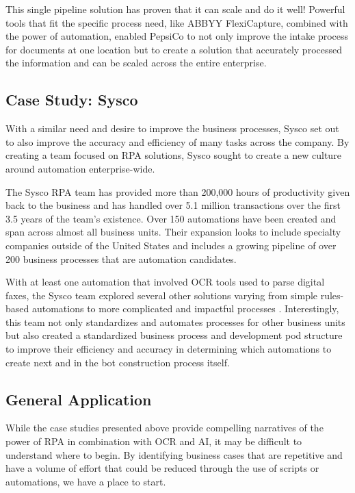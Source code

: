 \documentclass[conference]{IEEEtran}
\begin{document}
This single pipeline solution has proven that it can scale and do it well! Powerful tools that fit the specific process need, like ABBYY FlexiCapture, combined with the power of automation, enabled PepsiCo to not only improve the intake process for documents at one location but to create a solution that accurately processed the information and can be scaled across the entire enterprise.

\subsection{Case Study: Sysco}
With a similar need and desire to improve the business processes, Sysco set out to also improve the accuracy and efficiency of many tasks across the company. By creating a team focused on RPA solutions, Sysco sought to create a new culture around automation enterprise-wide.

The Sysco RPA team has provided more than 200,000 hours of productivity given back to the business and has handled over 5.1 million transactions over the first 3.5 years of the team's existence. Over 150 automations have been created and span across almost all business units. Their expansion looks to include specialty companies outside of the United States and includes a growing pipeline of over 200 business processes that are automation candidates. \cite{bpcafe2021sysco:slides}

With at least one automation that involved OCR tools used to parse digital faxes, the Sysco team explored several other solutions varying from simple rules-based automations to more complicated and impactful processes \cite{bpcafe2021sysco}. Interestingly, this team not only standardizes and automates processes for other business units but also created a standardized business process and development pod structure to improve their efficiency and accuracy in determining which automations to create next and in the bot construction process itself.

\subsection{General Application}
While the case studies presented above provide compelling narratives of the power of RPA in combination with OCR and AI, it may be difficult to understand where to begin. By identifying business cases that are repetitive and have a volume of effort that could be reduced through the use of scripts or automations, we have a place to start.
\end{document}
